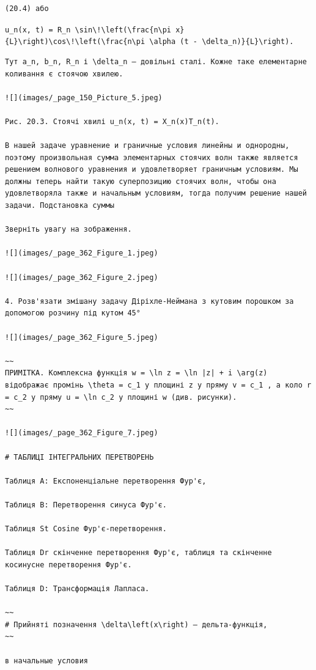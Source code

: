 \documentclass[
  ukrainian,
]{article}
\begin{document}
\begin{verbatim}
(20.4) або
\end{verbatim}

\texttt{u\_n(x,\ t)\ =\ R\_n\ \textbackslash{}sin\textbackslash{}!\textbackslash{}left(\textbackslash{}frac\{n\textbackslash{}pi\ x\}\{L\}\textbackslash{}right)\textbackslash{}cos\textbackslash{}!\textbackslash{}left(\textbackslash{}frac\{n\textbackslash{}pi\ \textbackslash{}alpha\ (t\ -\ \textbackslash{}delta\_n)\}\{L\}\textbackslash{}right).}

\begin{verbatim}
Тут a_n, b_n, R_n і \delta_n — довільні сталі. Кожне таке елементарне коливання є стоячою хвилею.

![](images/_page_150_Picture_5.jpeg)

Рис. 20.3. Стоячі хвилі u_n(x, t) = X_n(x)T_n(t).

В нашей задаче уравнение и граничные условия линейны и однородны, поэтому произвольная сумма элементарных стоячих волн также является решением волнового уравнения и удовлетворяет граничным условиям. Мы должны теперь найти такую суперпозицию стоячих волн, чтобы она удовлетворяла также и начальным условиям, тогда получим решение нашей задачи. Подстановка суммы

Зверніть увагу на зображення.

![](images/_page_362_Figure_1.jpeg)

![](images/_page_362_Figure_2.jpeg)

4. Розв'язати змішану задачу Діріхле-Неймана з кутовим порошком за допомогою розчину під кутом 45°

![](images/_page_362_Figure_5.jpeg)

~~
ПРИМІТКА. Комплексна функція w = \ln z = \ln |z| + i \arg(z) відображає промінь \theta = c_1 у площині z у пряму v = c_1 , а коло r = c_2 у пряму u = \ln c_2 у площині w (див. рисунки).
~~

![](images/_page_362_Figure_7.jpeg)

# ТАБЛИЦІ ІНТЕГРАЛЬНИХ ПЕРЕТВОРЕНЬ

Таблиця A: Експоненціальне перетворення Фур'є,

Таблиця B: Перетворення синуса Фур'є.

Таблиця St Cosine Фур'є-перетворення.

Таблиця Dr скінченне перетворення Фур'є, таблиця та скінченне косинусне перетворення Фур'є.

Таблиця D: Трансформація Лапласа.

~~
# Прийняті позначення \delta\left(x\right) — дельта-функція,
~~

в начальные условия
\end{verbatim}
\end{document}
